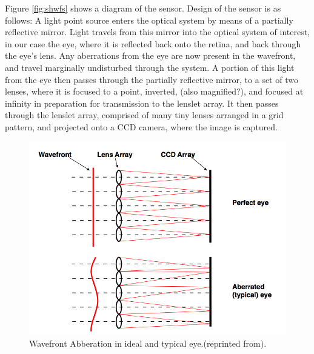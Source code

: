 \documentclass{article}
\begin{document}
Figure \ref{fig:shwfs} shows a diagram of the sensor. Design of the sensor is as follows: A light point source enters the optical system by means of a partially reflective mirror. Light travels from this mirror into the optical system of interest, in our case the eye, where it is reflected back onto the retina, and back through the eye's lens. Any aberrations from the eye are now present in the wavefront, and travel marginally undisturbed through the system. A portion of this light from the eye then passes through the partially reflective mirror, to a set of two lenses, where it is focused to a point, inverted, (also magnified?), and focused at infinity in preparation for transmission to the lenslet array. It then passes through the lenslet array, comprised of many tiny lenses arranged in a grid pattern, and projected onto a CCD camera, where the image is captured.

\begin{figure}
  \centering
    \includegraphics[width=1\linewidth]{wavefrontabb.png}
  \caption{Wavefront Abberation in ideal and typical eye.(reprinted from{\cite{austinsslides}}).}
  \label{fig:wfabb}
\end{figure}
\end{document}
